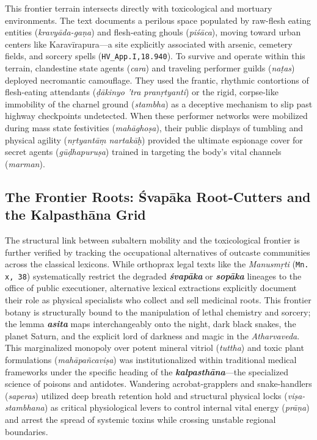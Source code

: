 \documentclass[11pt,letterpaper]{article}
\begin{document}
This frontier terrain intersects directly with toxicological and mortuary environments. The text documents a perilous space populated by raw-flesh eating entities (\textit{kravyāda-gaṇa}) and flesh-eating ghouls (\textit{piśāca}), moving toward urban centers like Karavīrapura---a site explicitly associated with arsenic, cemetery fields, and sorcery spells (\texttt{HV\_App.I,18.940}). To survive and operate within this terrain, clandestine state agents (\textit{cara}) and traveling performer guilds (\textit{naṭas}) deployed necromantic camouflage. They used the frantic, rhythmic contortions of flesh-eating attendants (\textit{ḍākinyo 'tra pranṛtyanti}) or the rigid, corpse-like immobility of the charnel ground (\textit{stambha}) as a deceptive mechanism to slip past highway checkpoints undetected. When these performer networks were mobilized during mass state festivities (\textit{mahāghoṣa}), their public displays of tumbling and physical agility (\textit{nṛtyantāṃ nartakāḥ}) provided the ultimate espionage cover for secret agents (\textit{gūḍhapuruṣa}) trained in targeting the body's vital channels (\textit{marman}).

\subsection{The Frontier Roots: Śvapāka Root-Cutters and the Kalpasthāna Grid}
The structural link between subaltern mobility and the toxicological frontier is further verified by tracking the occupational alternatives of outcaste communities across the classical lexicons. While orthoprax legal texts like the \textit{Manusmṛti} (\texttt{Mn. x, 38}) systematically restrict the degraded \textbf{\textit{śvapāka}} or \textbf{\textit{sopāka}} lineages to the office of public executioner, alternative lexical extractions explicitly document their role as physical specialists who collect and sell medicinal roots. This frontier botany is structurally bound to the manipulation of lethal chemistry and sorcery; the lemma \textbf{\textit{asita}} maps interchangeably onto the night, dark black snakes, the planet Saturn, and the explicit lord of darkness and magic in the \textit{Atharvaveda}. This marginalized monopoly over potent mineral vitriol (\textit{tuttha}) and toxic plant formulations (\textit{mahāpañcaviṣa}) was institutionalized within traditional medical frameworks under the specific heading of the \textbf{\textit{kalpasthāna}}---the specialized science of poisons and antidotes. Wandering acrobat-grapplers and snake-handlers (\textit{saperas}) utilized deep breath retention hold and structural physical locks (\textit{viṣa-stambhana}) as critical physiological levers to control internal vital energy (\textit{prāṇa}) and arrest the spread of systemic toxins while crossing unstable regional boundaries.
\end{document}
